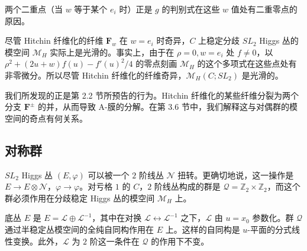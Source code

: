 
两个二重点（当 $w$ 等于某个 $e_i$ 时）正是 $g$ 的判别式在这些 $w$ 值处有二重零点的原因。

尽管 Hitchin 纤维化的纤维 $\boldsymbol{F}_w$ 在 $w=e_i$ 时奇异，$C$ 上稳定分歧 $SL_2$ Higgs 丛的模空间 $\mathcal{M}_H$ 实际上是光滑的。事实上，由于在 $\rho=0,w=e_i$ 处 $f\ne 0$，以 $\rho^2+(2u+w)f(u)-f'(u)^2/4$ 的零点刻画 $\mathcal{M}_H$ 的这个多项式在这些点处有非零微分。所以尽管 Hitchin 纤维化的纤维奇异，$\mathcal{M}_H(C;SL_2)$ 是光滑的。

我们所发现的正是第 2.2 节所预告的行为。Hitchin 纤维化的某些纤维分裂为两个分支 $\boldsymbol{F}^{\pm}$ 的并，从而导致 A-膜的分解。在第 3.6 节中，我们解释这与对偶群的模空间的奇点有何关系。

\subsection{对称群}

$SL_2$ Higgs 丛 $(E,\varphi)$ 可以被一个 $2$ 阶线丛 $\mathcal{N}$ 扭转。更确切地说，这一操作是 $E\to E\otimes\mathcal{N}$，$\varphi\to\varphi$。对亏格 $1$ 的 $C$，$2$ 阶线丛构成的群是 $\mathcal{Q}=\mathbb{Z}_2\times\mathbb{Z}_2$，而这个群必须作用在分歧稳定 Higgs 丛的模空间 $\mathcal{M}_H$ 上。

底丛 $E$ 是 $E=\mathcal{L}\oplus\mathcal{L}^{-1}$，其中在对换 $\mathcal{L}\leftrightarrow\mathcal{L}^{-1}$ 之下，$\mathcal{L}$ 由 $u=x_0$ 参数化。群 $\mathcal{Q}$ 通过半稳定丛模空间的全纯自同构作用在 $E$ 上。这样的自同构是 $u$-平面的分式线性变换。此外，$\mathcal{L}$ 为 $2$ 阶这一条件在 $\mathcal{Q}$ 的作用下不变。

